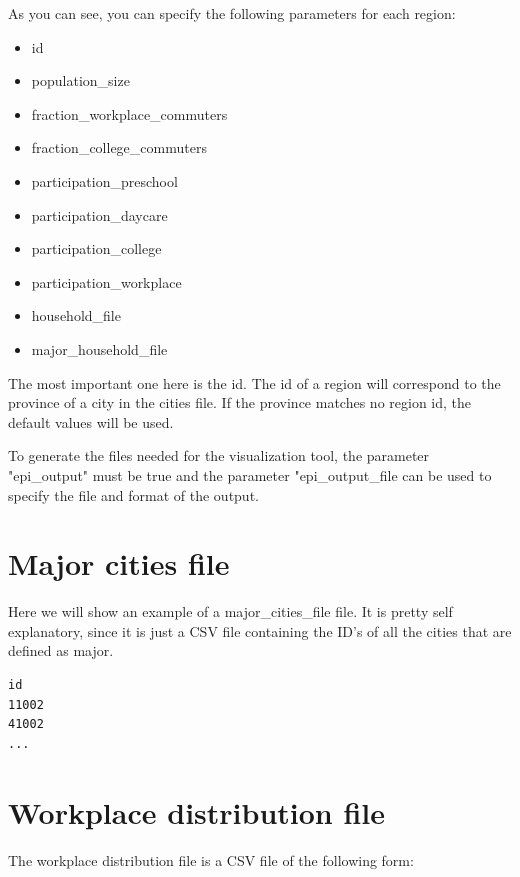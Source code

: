 As you can see, you can specify the following parameters for each region:

\begin{multicols}{2}
\begin{itemize}
    \item id
    \item population\_size
    \item fraction\_workplace\_commuters
    \item fraction\_college\_commuters
    \item participation\_preschool
    \item participation\_daycare
    \item participation\_college
    \item participation\_workplace
    \item household\_file
    \item major\_household\_file
\end{itemize}
\end{multicols}

The most important one here is the id. The id of a region will correspond to the province of a city in the cities file. If the province matches no region id, the default values will be used.

To generate the files needed for the visualization tool, the parameter "epi\_output" must be true and the parameter "epi\_output\_file can be used to specify the file and format of the output.

\section{Major cities file}
\label{section:major_cities}

Here we will show an example of a major\_cities\_file file. It is pretty self explanatory, since it is just a CSV file containing the ID's of all the cities that are defined as major.

\begin{lstlisting}[caption={major\_cities\_file example},captionpos=b]
id
11002
41002
...
\end{lstlisting}

\section{Workplace distribution file}

The workplace distribution file is a CSV file of the following form: 

